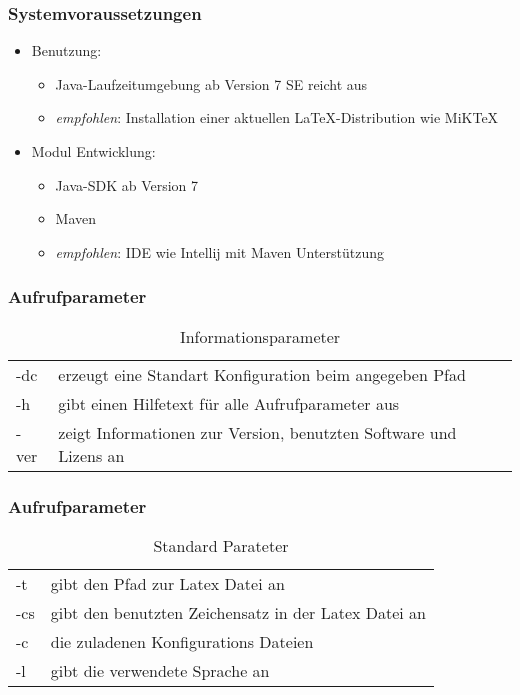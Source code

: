 \begin{frame}
\frametitle{Systemvoraussetzungen}
\begin{block}{\vspace*{-3ex}}
	\begin{itemize}
	  \item Benutzung: 
	  \begin{itemize}
	  	\item Java-Laufzeitumgebung ab Version 7 SE reicht aus
	  	\item \emph{empfohlen}: Installation einer aktuellen LaTeX-Distribution wie MiKTeX  
	  \end{itemize}
	  \item Modul Entwicklung: 
	  	\begin{itemize}
	  	  	\item Java-SDK ab Version 7
	  	  	\item Maven
	  	  	\item \emph{empfohlen}: IDE wie Intellij mit Maven Unterstützung
	  	\end{itemize}  	  
	\end{itemize}
\end{block}
\end{frame}

\begin{frame}
\frametitle{Aufrufparameter}
\begin{block}{\vspace*{-3ex}}
\begin{table}[h]
\caption{Informationsparameter}
	\begin{tabular}{l|p{9cm}}
		-dc & erzeugt eine Standart Konfiguration beim angegeben Pfad\\
		-h  & gibt einen Hilfetext für alle Aufrufparameter aus\\
		-ver & zeigt Informationen zur Version, benutzten Software und Lizens an
	\end{tabular}
\end{table}
\end{block}
\end{frame}

\begin{frame}
\frametitle{Aufrufparameter}
\begin{block}{\vspace*{-3ex}}
\begin{table}[h]
\caption{Standard Parateter}
	\begin{tabular}{l|p{9cm}}
		-t & gibt den Pfad zur Latex Datei an\\
		-cs & gibt den benutzten Zeichensatz in der Latex Datei an\\
		-c & die zuladenen Konfigurations Dateien\\
		-l & gibt die verwendete Sprache an
	\end{tabular}
\end{table}
\end{block}
\end{frame}

